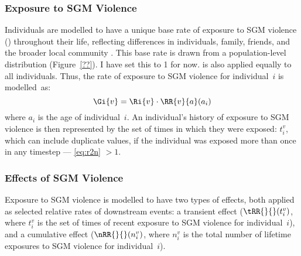 \subsubsection{Exposure to SGM Violence}\label{mod.par.evt.vex}
Individuals are modelled to have
a unique base rate of exposure to SGM violence () throughout their life,
reflecting differences in individuals, family, friends, and the broader local community
\cite{??}.
This base rate is drawn from a population-level distribution (Figure~\ref{??}).
     {I have set this to 1 for now.}
 is also applied equally to all individuals.
Thus, the rate of
exposure to SGM violence for individual~$i$ is modelled~as:
\begin{equation}
  \Gi{v} = \Ri{v} \cdot \RR{v}{a}(a_i)
\end{equation}
where $a_i$ is the age of individual~$i$.
An individual's history of exposure to SGM violence
is then represented by the set of times in which they were exposed: $t^v_i$,
which can include duplicate values,
if the individual was exposed more than once in any timestep
--- \ie \eqref{eq:r2n} $> 1$.
\subsubsection{Effects of SGM Violence}\label{mod.par.evt.vef}
Exposure to SGM violence is modelled to have two types of effects,
both applied as selected relative rates of downstream events:
a transient effect ($\tRR{}{}(t^v_i)$, where
$t^v_i$ is the set of times of recent exposure to SGM violence for individual~$i$), and
a cumulative effect ($\nRR{}{}(n^v_i)$, where
$n^v_i$ is the total number of lifetime exposures to SGM violence for individual~$i$).
